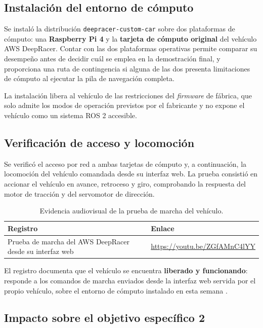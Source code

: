 \documentclass[12pt,letterpaper]{article}
\begin{document}
\subsection{Instalación del entorno de cómputo}

Se instaló la distribución \texttt{deepracer-custom-car} sobre dos plataformas de cómputo: una \textbf{Raspberry Pi 4} y la \textbf{tarjeta de cómputo original} del vehículo AWS DeepRacer. Contar con las dos plataformas operativas permite comparar su desempeño antes de decidir cuál se emplea en la demostración final, y proporciona una ruta de contingencia si alguna de las dos presenta limitaciones de cómputo al ejecutar la pila de navegación completa.

La instalación libera al vehículo de las restricciones del \textit{firmware} de fábrica, que solo admite los modos de operación previstos por el fabricante y no expone el vehículo como un sistema ROS 2 accesible.

\subsection{Verificación de acceso y locomoción}

Se verificó el acceso por red a ambas tarjetas de cómputo y, a continuación, la locomoción del vehículo comandada desde su interfaz web. La prueba consistió en accionar el vehículo en avance, retroceso y giro, comprobando la respuesta del motor de tracción y del servomotor de dirección.

\begin{table}[H]
    \centering
    \small
    \caption{Evidencia audiovisual de la prueba de marcha del vehículo.}
    \label{tab:evidencia_video}
    \begin{tabular}{@{}ll@{}}
        \toprule
        \textbf{Registro} & \textbf{Enlace} \\ \midrule
        Prueba de marcha del AWS DeepRacer desde su interfaz web & \url{https://youtu.be/ZGfAMnC4lYY} \\ \bottomrule
    \end{tabular}
\end{table}

El registro documenta que el vehículo se encuentra \textbf{liberado y funcionando}: responde a los comandos de marcha enviados desde la interfaz web servida por el propio vehículo, sobre el entorno de cómputo instalado en esta semana \cite{video_locomocion}.

\subsection{Impacto sobre el objetivo específico 2}
\end{document}
